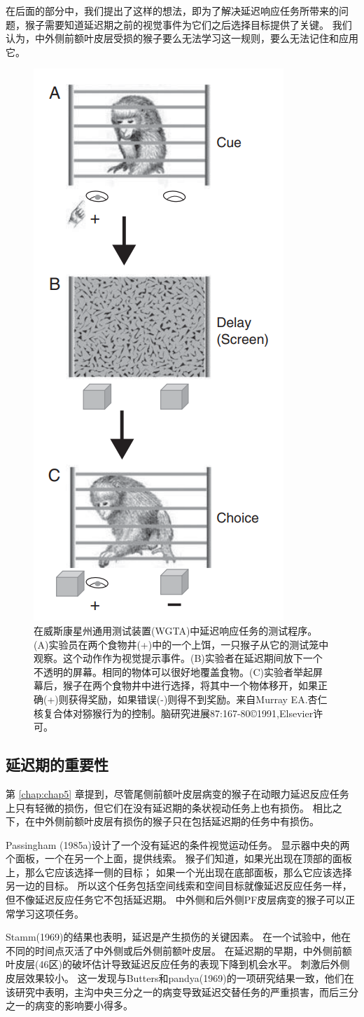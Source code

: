 在后面的部分中，我们提出了这样的想法，即为了解决延迟响应任务所带来的问题，猴子需要知道延迟期之前的视觉事件为它们之后选择目标提供了关键。
我们认为，中外侧前额叶皮层受损的猴子要么无法学习这一规则，要么无法记住和应用它。


\begin{figure}
	\centering
	\includegraphics[width=0.2\linewidth]{image_pfc/Fig_6_3}
	\caption{在威斯康星州通用测试装置(WGTA)中延迟响应任务的测试程序。(A)实验员在两个食物井(+)中的一个上饵，一只猴子从它的测试笼中观察。这个动作作为视觉提示事件。(B)实验者在延迟期间放下一个不透明的屏幕。相同的物体可以很好地覆盖食物。(C)实验者举起屏幕后，猴子在两个食物井中进行选择，将其中一个物体移开，如果正确(+)则获得奖励，如果错误(-)则得不到奖励。来自Murray EA.杏仁核复合体对猕猴行为的控制。脑研究进展87:167-80©1991,Elsevier许可。}
	\label{fig:fig}
\end{figure}



\subsection{延迟期的重要性}

第 \ref{chap:chap5} 章提到，尽管尾侧前额叶皮层病变的猴子在动眼力延迟反应任务上只有轻微的损伤，但它们在没有延迟期的条状视动任务上也有损伤。
相比之下，在中外侧前额叶皮层有损伤的猴子只在包括延迟期的任务中有损伤。


Passingham (1985a)设计了一个没有延迟的条件视觉运动任务。
显示器中央的两个面板，一个在另一个上面，提供线索。
猴子们知道，如果光出现在顶部的面板上，那么它应该选择一侧的目标；
如果一个光出现在底部面板，那么它应该选择另一边的目标。
所以这个任务包括空间线索和空间目标就像延迟反应任务一样，但不像延迟反应任务它不包括延迟期。
中外侧和后外侧PF皮层病变的猴子可以正常学习这项任务。


Stamm(1969)的结果也表明，延迟是产生损伤的关键因素。
在一个试验中，他在不同的时间点灭活了中外侧或后外侧前额叶皮层。
在延迟期的早期，中外侧前额叶皮层(46区)的破坏估计导致延迟反应任务的表现下降到机会水平。
刺激后外侧皮层效果较小。
这一发现与Butters和pandya(1969)的一项研究结果一致，他们在该研究中表明，主沟中央三分之一的病变导致延迟交替任务的严重损害，而后三分之一的病变的影响要小得多。


